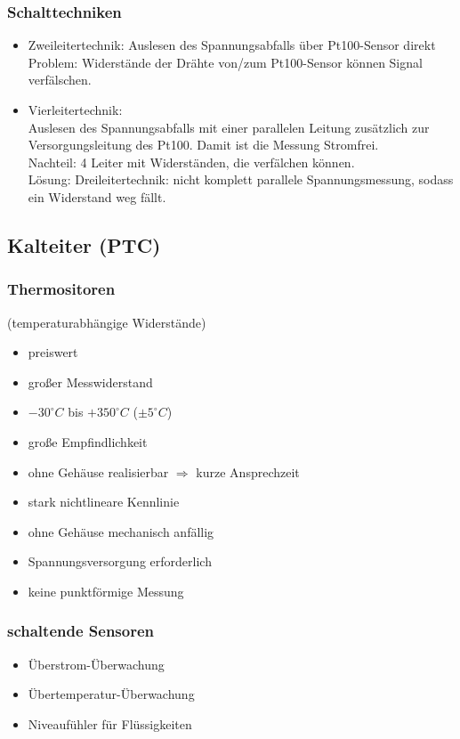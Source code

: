 \subsubsection*{Schalttechniken}
\begin{itemize}
\item Zweileitertechnik:
Auslesen des Spannungsabfalls über Pt100-Sensor direkt\\
Problem: Widerstände der Drähte von/zum Pt100-Sensor können Signal verfälschen.
\item Vierleitertechnik:\\
Auslesen des Spannungsabfalls mit einer parallelen Leitung zusätzlich zur Versorgungsleitung des Pt100. Damit ist die Messung Stromfrei. \\
Nachteil: 4 Leiter mit Widerständen, die verfälchen können.\\
Lösung: Dreileitertechnik: nicht komplett parallele Spannungsmessung, sodass ein Widerstand weg fällt.
\end{itemize}
\subsection{Kalteiter (PTC)}
\subsubsection{Thermositoren} (temperaturabhängige Widerstände)
\begin{itemize}[label=$+$]
\item preiswert
\item großer Messwiderstand
\item $-30^\circ C$ bis $+350^\circ C$ ($\pm 5^\circ C$)
\item große Empfindlichkeit
\item ohne Gehäuse realisierbar $\Rightarrow$ kurze Ansprechzeit
\end{itemize}
\begin{itemize}[label=$-$]
\item stark nichtlineare Kennlinie
\item ohne Gehäuse mechanisch anfällig
\item Spannungsversorgung erforderlich
\item keine punktförmige Messung
\end{itemize}
\subsubsection{schaltende Sensoren}
\begin{itemize}
\item Überstrom-Überwachung
\item Übertemperatur-Überwachung
\item Niveaufühler für Flüssigkeiten
\end{itemize}
